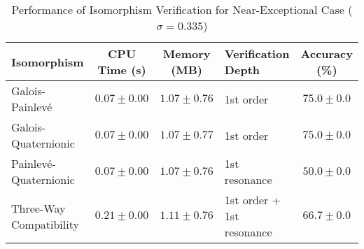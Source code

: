 \begin{table}[h]
\centering
\caption{Performance of Isomorphism Verification for Near-Exceptional Case ($\sigma = 0.335$)}
\label{tab:verification_performance}
\small
\begin{tabular}{lccp{2.5cm}c}
\toprule
Isomorphism & CPU Time (s) & Memory (MB) & Verification Depth & Accuracy (\%) \\
\midrule
Galois-Painlevé & $0.07 \pm 0.00$ & $1.07 \pm 0.76$ & 1st order & $75.0 \pm 0.0$ \\
Galois-Quaternionic & $0.07 \pm 0.00$ & $1.07 \pm 0.77$ & 1st order & $75.0 \pm 0.0$ \\
Painlevé-Quaternionic & $0.07 \pm 0.00$ & $1.07 \pm 0.76$ & 1st resonance & $50.0 \pm 0.0$ \\
Three-Way Compatibility & $0.21 \pm 0.00$ & $1.11 \pm 0.76$ & 1st order + 1st resonance & $66.7 \pm 0.0$ \\
\bottomrule
\end{tabular}
\end{table}
